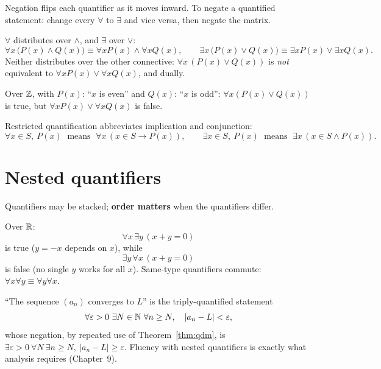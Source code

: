 Negation flips each quantifier as it moves inward. To negate a quantified
statement: change every $\forall$ to $\exists$ and vice versa, then negate the
matrix.

\begin{theorem}
$\forall$ distributes over $\wedge$, and $\exists$ over $\vee$:
\[
\forall x\,\bigl(P(x) \wedge Q(x)\bigr) \equiv \forall x P(x) \wedge \forall x Q(x),
\qquad
\exists x\,\bigl(P(x) \vee Q(x)\bigr) \equiv \exists x P(x) \vee \exists x Q(x).
\]
Neither distributes over the other connective: $\forall x\,(P(x) \vee Q(x))$
is \emph{not} equivalent to $\forall x P(x) \vee \forall x Q(x)$, and dually.
\end{theorem}

\begin{example}
Over $\mathbb{Z}$, with $P(x)$: ``$x$ is even'' and $Q(x)$: ``$x$ is odd'':
$\forall x (P(x) \vee Q(x))$ is true, but
$\forall x P(x) \vee \forall x Q(x)$ is false.
\end{example}

Restricted quantification abbreviates implication and conjunction:
\[
\forall x \in S,\ P(x) \;\text{ means }\; \forall x\,(x \in S \to P(x)),
\qquad
\exists x \in S,\ P(x) \;\text{ means }\; \exists x\,(x \in S \wedge P(x)).
\]

\section{Nested quantifiers}

Quantifiers may be stacked; \textbf{order matters} when the quantifiers
differ.

\begin{example}
Over $\mathbb{R}$:
\[
\forall x\, \exists y\, (x + y = 0)
\]
is true ($y = -x$ depends on $x$), while
\[
\exists y\, \forall x\, (x + y = 0)
\]
is false (no single $y$ works for all $x$). Same-type quantifiers commute:
$\forall x \forall y \equiv \forall y \forall x$.
\end{example}

\begin{example}
``The sequence $(a_n)$ converges to $L$'' is the triply-quantified statement
\[
\forall \varepsilon > 0\ \exists N \in \mathbb{N}\ \forall n \geq N,\quad
|a_n - L| < \varepsilon,
\]
whose negation, by repeated use of Theorem~\ref{thm:qdm}, is
$\exists \varepsilon > 0\ \forall N\ \exists n \geq N,\ |a_n - L| \geq
\varepsilon$. Fluency with nested quantifiers is exactly what analysis
requires (Chapter~9).
\end{example}

